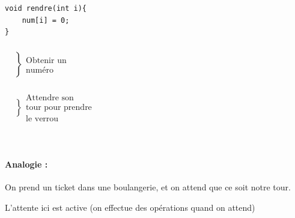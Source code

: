 \begin{algo}
\begin{minipage}{0.6\linewidth}
\begin{lstlisting}[style=CStyle]
void rendre(int i){
	num[i] = 0;
}\end{lstlisting}
\end{minipage}
\begin{minipage}{0.25\linewidth}
	$\begin{array}{l}
	\left. \begin{array}{c} \\ \\ \\ \\ \\ \end{array} \right\} \begin{array}{c} \\ \\ \text{Obtenir un} \\\text{numéro} \\ \\ \end{array} \\
	\\
	\left. \begin{array}{c} \\ \\ \\ \\ \end{array} \right\} \begin{array}{c} \\ \text{Attendre son} \\\text{tour pour prendre} \\ \text{le verrou} \\ \end{array}
	\\ \\ \\ \\ \\
	\end{array}
	$
\end{minipage}
\end{algo}

\paragraph{Analogie :} On prend un ticket dans une boulangerie, et on attend que ce soit notre tour.

\begin{rem}
	L'attente ici est active (on effectue des opérations quand on attend)
\end{rem}

